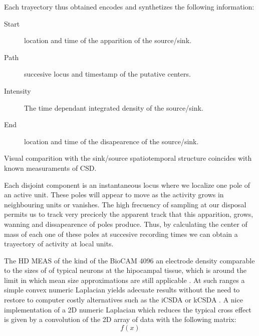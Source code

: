 \documentclass{article}
\begin{document}
Each trayectory thus obtained encodes and synthetizes the following information:
\begin{description}
\item[Start] location and time of the apparition of the source/sink.
\item[Path] succesive locus and timestamp of the putative centers.
\item[Intensity] The time dependant integrated density of the source/sink.  
\item[End] location and time of the disapearence of the source/sink.
\end{description}

Visual comparition with the sink/source spatiotemporal structure coincides
with known measuraments of CSD. 


Each disjoint component is an instantaneous locus where we localize one pole of
an active unit. These poles will appear to move as the activity grows in neighbouring
units or vanishes. The high frecuency of sampling at our disposal permits us to
track very precicely the apparent track that this apparition, grows, wanning and
dissapearence of poles produce. Thus, by calculating the center of mass of
each one of these poles at succesive recording times
we can obtain a trayectory of activity at local units. 


The HD MEAS of the kind of the BioCAM 4096  an electrode density comparable
to the sizes of of typical neurons at the hipocampal tissue, which is around
the limit in which mean size approximations are still applicable \cite{Bedard2011}.
At such ranges a simple convex numeric Laplacian yields adecuate results without
the need to restore to computer costly alternatives such as the iCSDA or kCSDA
\cite{Leski2011, Potworowsky2011}. A nice implementation of a 2D numeric Laplacian
which reduces the typical cross effect is given by a convolution of
the 2D array of data with the following matrix:
\begin{equation}
f(x)
\end{equation}
\end{document}

